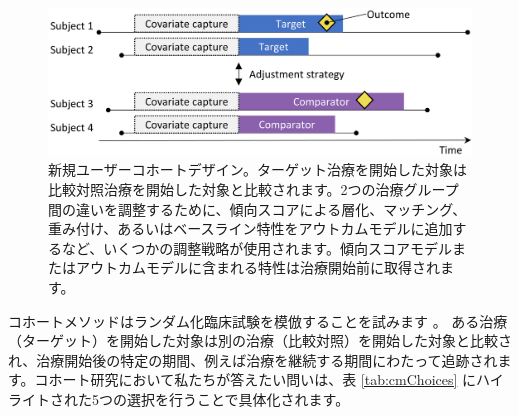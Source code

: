 \documentclass[
  11pt]{book}
\theoremstyle{definition}
\theoremstyle{definition}
\theoremstyle{definition}
\theoremstyle{definition}
\theoremstyle{remark}
\begin{document}

\begin{figure}

{\centering \includegraphics[width=0.9\linewidth]{images/PopulationLevelEstimation/cohortMethod} 

}

\caption{新規ユーザーコホートデザイン。ターゲット治療を開始した対象は比較対照治療を開始した対象と比較されます。2つの治療グループ間の違いを調整するために、傾向スコアによる層化、マッチング、重み付け、あるいはベースライン特性をアウトカムモデルに追加するなど、いくつかの調整戦略が使用されます。傾向スコアモデルまたはアウトカムモデルに含まれる特性は治療開始前に取得されます。}\label{fig:cohortMethod}
\end{figure}

コホートメソッドはランダム化臨床試験を模倣することを試みます \citep{hernan_2016}。 ある治療（ターゲット）を開始した対象は別の治療（比較対照）を開始した対象と比較され、治療開始後の特定の期間、例えば治療を継続する期間にわたって追跡されます。コホート研究において私たちが答えたい問いは、表 \ref{tab:cmChoices} にハイライトされた5つの選択を行うことで具体化されます。   
\end{document}
